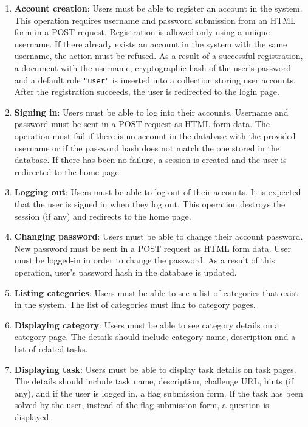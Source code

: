 \begin{enumerate}
	\item \textbf{Account creation}: Users must be able to register an account in the system.
	This operation requires username and password submission from an HTML form in a POST request.
	Registration is allowed only using a unique username. If there already exists an account in the system with the same username, the action must be refused.
	As a result of a successful registration, a document with the username, cryptographic hash of the user's password and a default role \texttt{"user"} is inserted into a collection storing user accounts. After the registration succeeds, the user is redirected to the login page.

	\item \textbf{Signing in}: Users must be able to log into their accounts.
	Username and password must be sent in a POST request as HTML form data. The operation must fail if there is no account in the database with the provided username or if the password hash does not match the one stored in the database.
	If there has been no failure, a session is created and the user is redirected to the home page.

	\item \textbf{Logging out}: Users must be able to log out of their accounts.
	It is expected that the user is signed in when they log out. This operation destroys the session (if any) and redirects to the home page.

	\item \textbf{Changing password}: Users must be able to change their account password.
	New password must be sent in a POST request as HTML form data. User must be logged-in in order to change the password.
	As a result of this operation, user's password hash in the database is updated.

	\item \textbf{Listing categories}: Users must be able to see a list of categories that exist in the system. The list of categories must link to category pages.

	\item \textbf{Displaying category}: Users must be able to see category details on a category page. The details should include category name, description and a list of related tasks.

	\item \textbf{Displaying task}: Users must be able to display task details on task pages. The details should include task name, description, challenge URL, hints (if any), and if the user is logged in, a flag submission form. If the task has been solved by the user, instead of the flag submission form, a question is displayed.


\end{enumerate}
